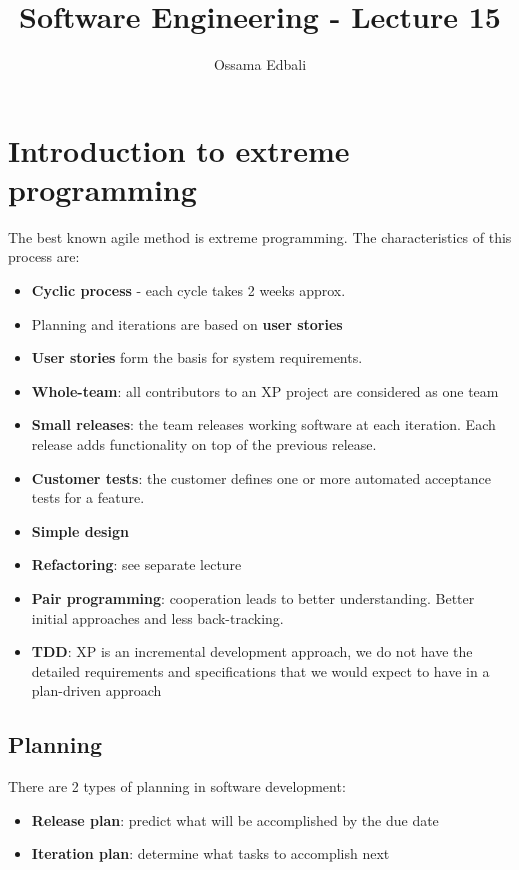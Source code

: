 \documentclass{article}
\title{Software Engineering - Lecture 15}
\author{Ossama Edbali}
\begin{document}
	
	\maketitle
	
	\section*{Introduction to extreme programming}
	The best known agile method is extreme programming. The characteristics of this process are:
	\begin{itemize}
		\item \textbf{Cyclic process} - each cycle takes 2 weeks approx.
		\item Planning and iterations are based on \textbf{user stories}
		\item \textbf{User stories} form the basis for system requirements.
		\item \textbf{Whole-team}: all contributors to an XP project are considered as one team
		\item \textbf{Small releases}: the team releases working software at each iteration. Each release
		adds functionality on top of the previous release.
		\item \textbf{Customer tests}: the customer defines one or more automated acceptance tests for a feature.
		\item \textbf{Simple design}
		\item \textbf{Refactoring}: see separate lecture
		\item \textbf{Pair programming}: cooperation leads to better understanding. Better initial approaches
		and less back-tracking.
		\item \textbf{TDD}: XP is an incremental development approach, we do not have the detailed requirements and
		specifications that we would expect to have in a plan-driven approach
	\end{itemize}
	
	\subsection*{Planning}
	There are 2 types of planning in software development:
	\begin{itemize}
		\item \textbf{Release plan}: predict what will be accomplished by the due date
		\item \textbf{Iteration plan}: determine what tasks to accomplish next
	\end{itemize}
	
\end{document}
